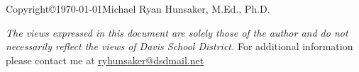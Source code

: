 \noindent\makebox[\linewidth]{\rule{\linewidth}{0.4pt}}
\mbox{}
\vfill
Copyright\copyright\quad\today\quad Michael Ryan Hunsaker, M.Ed., Ph.D.

\vspace{2.5em}
\textit{The views expressed in this document are solely those of the author and do not necessarily reflect the views of Davis School District.}
\vfill
For additional information please contact me at \href{mailto:ryhunsaker@dsdmail.net}{ryhunsaker@dsdmail.net}

